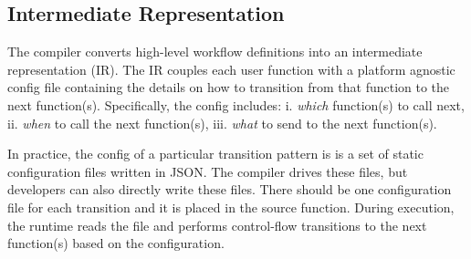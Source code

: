 



\subsection{\name{} Intermediate Representation}
\label{sec:ir}

The \name{} compiler converts high-level workflow definitions into an intermediate representation (IR). The IR couples each user function with a platform agnostic \name{} config file containing the details on how to transition from that function to the next function(s). Specifically, the \name{} config includes: i. \textit{which} function(s) to call next, ii. \textit{when} to call the next function(s), iii. \textit{what} to send to the next function(s). 



In practice, the \name{} config of a particular transition pattern is  is a set of static configuration
files written in JSON. The compiler drives these files, but developers can also directly write these files. 
There should be one configuration file for each transition and it
is placed in the source function. During
execution, the \name{} runtime reads the file and performs control-flow
transitions to the next function(s) based on the configuration.



